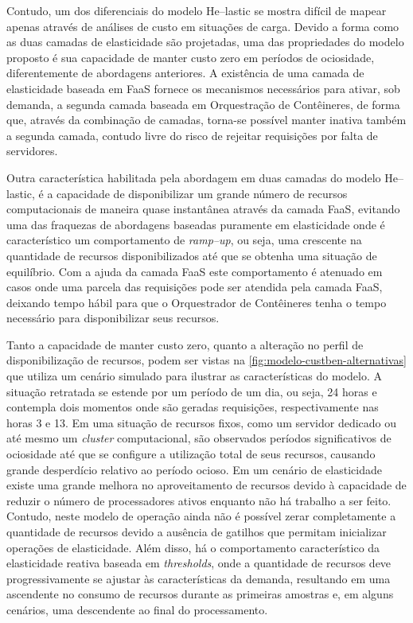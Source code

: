 \documentclass[english,brazilian]{UNISINOSmonografia} %
\begin{document}
Contudo, um dos diferenciais do modelo \textsf{He}--lastic se mostra difícil de mapear apenas através de análises de custo em situações de carga.
Devido a forma como as duas camadas de elasticidade são projetadas, uma das propriedades do modelo proposto é sua capacidade de manter custo zero em períodos de ociosidade, diferentemente de abordagens anteriores.
A existência de uma camada de elasticidade baseada em FaaS fornece os mecanismos necessários para ativar, sob demanda, a segunda camada baseada em Orquestração de Contêineres, de forma que, através da combinação de camadas, torna-se possível manter inativa também a segunda camada, contudo livre do risco de rejeitar requisições por falta de servidores.


Outra característica habilitada pela abordagem em duas camadas do modelo \textsf{He}--lastic, é a capacidade de disponibilizar um grande número de recursos computacionais de maneira quase instantânea através da camada FaaS, evitando uma das fraquezas de abordagens baseadas puramente em elasticidade onde é característico um comportamento de \textit{ramp--up}, ou seja, uma crescente na quantidade de recursos disponibilizados até que se obtenha uma situação de equilíbrio.
Com a ajuda da camada FaaS este comportamento é atenuado em casos onde uma parcela das requisições pode ser atendida pela camada FaaS, deixando tempo hábil para que o Orquestrador de Contêineres tenha o tempo necessário para disponibilizar seus recursos.


Tanto a capacidade de manter custo zero, quanto a alteração no perfil de disponibilização de recursos, podem ser vistas na \autoref{fig:modelo-custben-alternativas} que utiliza um cenário simulado para ilustrar as características do modelo.
A situação retratada se estende por um período de um dia, ou seja, 24 horas e contempla dois momentos onde são geradas requisições, respectivamente nas horas 3 e 13.
Em uma situação de recursos fixos, como um servidor dedicado ou até mesmo um \textit{cluster} computacional, são observados períodos significativos de ociosidade até que se configure a utilização total de seus recursos, causando grande desperdício relativo ao período ocioso.
Em um cenário de elasticidade existe uma grande melhora no aproveitamento de recursos devido à capacidade de reduzir o número de processadores ativos enquanto não há trabalho a ser feito.
Contudo, neste modelo de operação ainda não é possível zerar completamente a quantidade de recursos devido a ausência de gatilhos que permitam inicializar operações de elasticidade.
Além disso, há o comportamento característico da elasticidade reativa baseada em \textit{thresholds}, onde a quantidade de recursos deve progressivamente se ajustar às características da demanda, resultando em uma ascendente no consumo de recursos durante as primeiras amostras e, em alguns cenários, uma descendente ao final do processamento.
\end{document}
